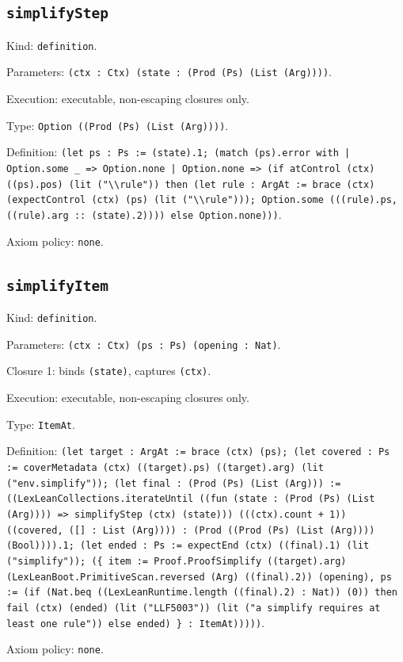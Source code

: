 \documentclass[11pt]{article}
\begin{document}
\subsection*{\texttt{simplifyStep}}
\noindent Kind: \texttt{definition}.\par
\noindent Parameters: \texttt{(ctx : Ctx) (state : (Prod (Ps) (List (Arg))))}.\par
\noindent Execution: executable, non-escaping closures only.\par
\noindent Type: \texttt{Option ((Prod (Ps) (List (Arg))))}.\par
\noindent Definition: \texttt{(let ps : Ps := (state).1; (match (ps).error with | Option.some \_ => Option.none | Option.none => (if atControl (ctx) ((ps).pos) (lit ("\textbackslash{}\textbackslash{}rule")) then (let rule : ArgAt := brace (ctx) (expectControl (ctx) (ps) (lit ("\textbackslash{}\textbackslash{}rule"))); Option.some (((rule).ps, ((rule).arg :: (state).2)))) else Option.none)))}.\par
\noindent Axiom policy: \texttt{none}.\par
\subsection*{\texttt{simplifyItem}}
\noindent Kind: \texttt{definition}.\par
\noindent Parameters: \texttt{(ctx : Ctx) (ps : Ps) (opening : Nat)}.\par
\noindent Closure 1: binds \texttt{(state)}, captures \texttt{(ctx)}.\par
\noindent Execution: executable, non-escaping closures only.\par
\noindent Type: \texttt{ItemAt}.\par
\noindent Definition: \texttt{(let target : ArgAt := brace (ctx) (ps); (let covered : Ps := coverMetadata (ctx) ((target).ps) ((target).arg) (lit ("env.simplify")); (let final : (Prod (Ps) (List (Arg))) := ((LexLeanCollections.iterateUntil ((fun (state : (Prod (Ps) (List (Arg)))) => simplifyStep (ctx) (state))) (((ctx).count + 1)) ((covered, ([] : List (Arg)))) : (Prod ((Prod (Ps) (List (Arg)))) (Bool)))).1; (let ended : Ps := expectEnd (ctx) ((final).1) (lit ("simplify")); (\{ item := Proof.ProofSimplify ((target).arg) (LexLeanBoot.PrimitiveScan.reversed (Arg) ((final).2)) (opening), ps := (if (Nat.beq ((LexLeanRuntime.length ((final).2) : Nat)) (0)) then fail (ctx) (ended) (lit ("LLF5003")) (lit ("a simplify requires at least one rule")) else ended) \} : ItemAt)))))}.\par
\noindent Axiom policy: \texttt{none}.\par
\end{document}
